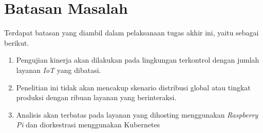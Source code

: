 \section{Batasan Masalah}
\label{sec:batasan-masalah}

Terdapat batasan yang diambil dalam pelaksanaan tugas akhir ini, yaitu sebagai berikut.

\begin{enumerate}
  \item Pengujian kinerja akan dilakukan pada lingkungan terkontrol dengan jumlah layanan \textit{IoT} yang dibatasi.
  \item Penelitian ini tidak akan mencakup skenario distribusi global atau tingkat produksi dengan ribuan layanan yang berinteraksi.
  \item Analisis akan terbatas pada layanan yang dihosting menggunakan \textit{Raspberry Pi} dan diorkestrasi menggunakan Kubernetes
\end{enumerate}

